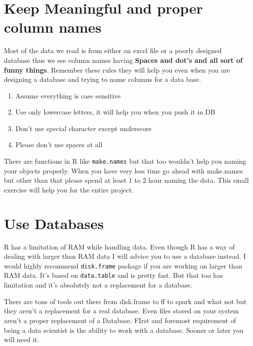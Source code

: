 \documentclass[
]{book}
\providecommand{\tightlist}{%
  \setlength{\itemsep}{0pt}\setlength{\parskip}{0pt}}
\begin{document}
\hypertarget{keep-meaningful-and-proper-column-names}{%
\section{Keep Meaningful and proper column names}\label{keep-meaningful-and-proper-column-names}}

Most of the data we read is from either an excel file or a poorly designed database thus we see column names having \textbf{Spaces and dot's and all sort of funny things}. Remember these rules they will help you even when you are designing a database and trying to name columns for a data base.

\begin{enumerate}
\def\labelenumi{\arabic{enumi}.}
\tightlist
\item
  Assume everything is case sensitive
\item
  Use only lowercase letters, it will help you when you push it in DB
\item
  Don't use special character except underscore
\item
  Please don't use spaces at all
\end{enumerate}

There are functions in R like \texttt{make.names} but that too wouldn't help you naming your objects properly. When you have very less time go ahead with make.names but other than that please spend at least 1 to 2 hour naming the data. This small exercise will help you for the entire project.

\hypertarget{use-databases}{%
\section{Use Databases}\label{use-databases}}

R has a limitation of RAM while handling data. Even though R has a way of dealing with larger than RAM data I will advice you to use a database instead. I would highly recommend \texttt{disk.frame} package if you are working on larger than RAM data. It's based on \texttt{data.table} and is pretty fast. But that too has limitation and it's absolutely not a replacement for a database.

There are tons of tools out there from disk.frame to ff to spark and what not but they aren't a replacement for a real database. Even files stored on your system aren't a proper replacement of a Database. FIrst and foremost requirement of being a data scientist is the ability to work with a database. Sooner or later you will need it.
\end{document}
